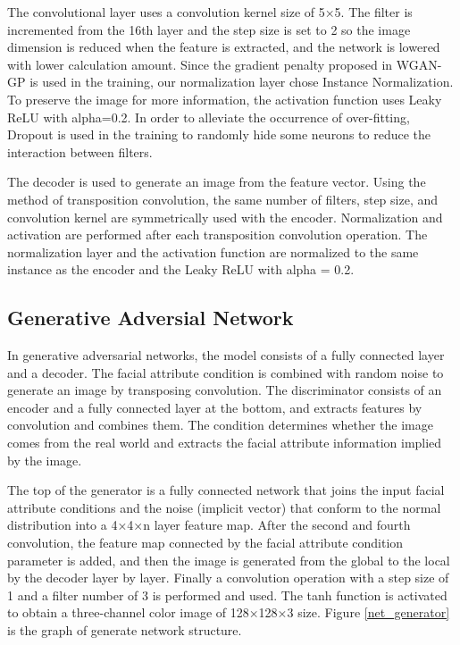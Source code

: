 The convolutional layer uses a convolution kernel size of 5×5.
The filter is incremented from the 16th layer and the step size is set to 2 so the image dimension is reduced when the feature is extracted,
    and the network is lowered with lower calculation amount.
Since the gradient penalty proposed in WGAN-GP is used in the training,
    our normalization layer chose Instance Normalization.
To preserve the image for more information, the activation function uses Leaky ReLU with alpha=0.2.
In order to alleviate the occurrence of over-fitting,
    Dropout is used in the training to randomly hide some neurons to reduce the interaction between filters.

The decoder is used to generate an image from the feature vector.
Using the method of transposition convolution, the same number of filters,
    step size, and convolution kernel are symmetrically used with the encoder.
Normalization and activation are performed after each transposition convolution operation.
The normalization layer and the activation function are normalized to the same instance as the encoder and the Leaky ReLU with alpha = 0.2.


\subsection{Generative Adversial Network}

In generative adversarial networks, the model consists of a fully connected layer and a decoder.
The facial attribute condition is combined with random noise to generate an image by transposing convolution.
The discriminator consists of an encoder and a fully connected layer at the bottom,
    and extracts features by convolution and combines them.
The condition determines whether the image comes from the real world and extracts the facial attribute information implied by the image.

The top of the generator is a fully connected network that joins the input facial attribute conditions and the noise (implicit vector) that conform to the normal distribution into a 4×4×n layer feature map.
After the second and fourth convolution, the feature map connected by the facial attribute condition parameter is added,
    and then the image is generated from the global to the local by the decoder layer by layer.
Finally a convolution operation with a step size of 1 and a filter number of 3 is performed and used.
The tanh function is activated to obtain a three-channel color image of 128×128×3 size.
Figure \ref{net_generator} is the graph of generate network structure.

